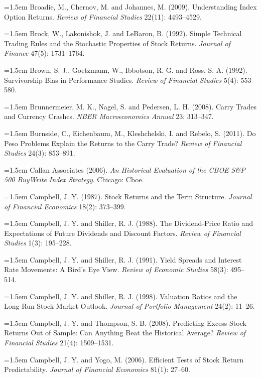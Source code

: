 \hangindent=1.5em Broadie, M., Chernov, M. and Johannes, M. (2009). Understanding Index Option Returns. \emph{Review of Financial Studies} 22(11): 4493--4529.

\hangindent=1.5em Brock, W., Lakonishok, J. and LeBaron, B. (1992). Simple Technical Trading Rules and the Stochastic Properties of Stock Returns. \emph{Journal of Finance} 47(5): 1731--1764.

\hangindent=1.5em Brown, S. J., Goetzmann, W., Ibbotson, R. G. and Ross, S. A. (1992). Survivorship Bias in Performance Studies. \emph{Review of Financial Studies} 5(4): 553--580.

\hangindent=1.5em Brunnermeier, M. K., Nagel, S. and Pedersen, L. H. (2008). Carry Trades and Currency Crashes. \emph{NBER Macroeconomics Annual} 23: 313--347.

\hangindent=1.5em Burnside, C., Eichenbaum, M., Kleshchelski, I. and Rebelo, S. (2011). Do Peso Problems Explain the Returns to the Carry Trade? \emph{Review of Financial Studies} 24(3): 853--891.

\hangindent=1.5em Callan Associates (2006). \emph{An Historical Evaluation of the CBOE S\&P 500 BuyWrite Index Strategy}. Chicago: Cboe.

\hangindent=1.5em Campbell, J. Y. (1987). Stock Returns and the Term Structure. \emph{Journal of Financial Economics} 18(2): 373--399.

\hangindent=1.5em Campbell, J. Y. and Shiller, R. J. (1988). The Dividend-Price Ratio and Expectations of Future Dividends and Discount Factors. \emph{Review of Financial Studies} 1(3): 195--228.

\hangindent=1.5em Campbell, J. Y. and Shiller, R. J. (1991). Yield Spreads and Interest Rate Movements: A Bird's Eye View. \emph{Review of Economic Studies} 58(3): 495--514.

\hangindent=1.5em Campbell, J. Y. and Shiller, R. J. (1998). Valuation Ratios and the Long-Run Stock Market Outlook. \emph{Journal of Portfolio Management} 24(2): 11--26.

\hangindent=1.5em Campbell, J. Y. and Thompson, S. B. (2008). Predicting Excess Stock Returns Out of Sample: Can Anything Beat the Historical Average? \emph{Review of Financial Studies} 21(4): 1509--1531.

\hangindent=1.5em Campbell, J. Y. and Yogo, M. (2006). Efficient Tests of Stock Return Predictability. \emph{Journal of Financial Economics} 81(1): 27--60.


